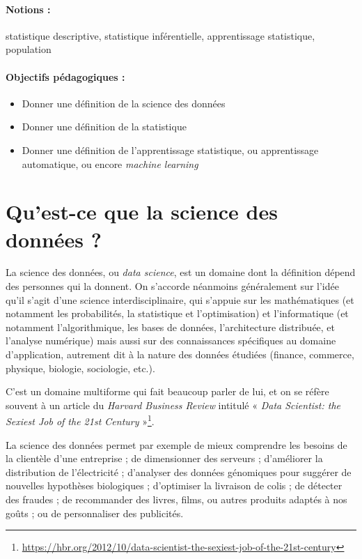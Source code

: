 \label{chap:intro}

\paragraph{Notions :} statistique descriptive, statistique inférentielle,
apprentissage statistique, population

\paragraph{Objectifs pédagogiques :}
\begin{itemize}
\item Donner une définition de la science des données
\item Donner une définition de la statistique 
\item Donner une définition de l'apprentissage statistique, ou apprentissage
  automatique, ou encore \textit{machine learning}
\end{itemize}



\section{Qu'est-ce que la science des données ?}
La science des données, ou \textit{data science}, est un domaine dont la
définition dépend des personnes qui la donnent. On s'accorde néanmoins
généralement sur l'idée qu'il s'agit d'une science interdisciplinaire, qui
s'appuie sur les mathématiques (et notamment les probabilités, la statistique
et l'optimisation) et l'informatique (et notamment l'algorithmique, les bases
de données, l'architecture distribuée, et l'analyse numérique) mais aussi sur
des connaissances spécifiques au domaine d'application, autrement dit à la
nature des données étudiées (finance, commerce, physique, biologie, sociologie,
etc.).

C'est un domaine multiforme qui fait beaucoup parler de lui, et on se réfère
souvent à un article du \textit{Harvard Business Review} intitulé «
\textit{Data Scientist: the Sexiest Job of the 21st Century}
»\footnote{\href{https://hbr.org/2012/10/data-scientist-the-sexiest-job-of-the-21st-century}{https://hbr.org/2012/10/data-scientist-the-sexiest-job-of-the-21st-century}}.

La science des données permet par exemple de mieux comprendre les besoins de la
clientèle d'une entreprise ; de dimensionner des serveurs ; d'améliorer la
distribution de l'électricité ; d'analyser des données génomiques pour suggérer
de nouvelles hypothèses biologiques ; d'optimiser la livraison de colis ; de
détecter des fraudes ; de recommander des livres, films, ou autres produits
adaptés à nos goûts ; ou de personnaliser des publicités.

